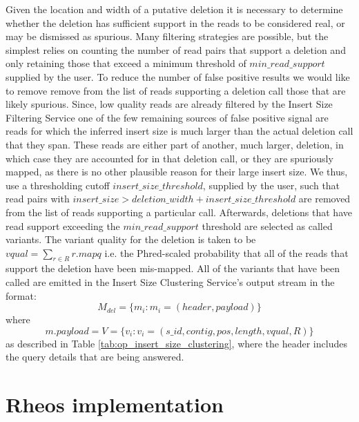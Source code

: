 Given the location and width of a putative deletion it is necessary to determine whether the deletion has sufficient support in the reads to be considered real, or may be dismissed as spurious. Many filtering strategies are possible, but the simplest relies on counting the number of read pairs that support a deletion and only retaining those that exceed a minimum threshold of $min\_read\_support$ supplied by the user. To reduce the number of false positive results we would like to remove remove from the list of reads supporting a deletion call those that are likely spurious. Since, low quality reads are already filtered by the Insert Size Filtering Service one of the few remaining sources of false positive signal are reads for which the inferred insert size is much larger than the actual deletion call that they span. These reads are either part of another, much larger, deletion, in which case they are accounted for in that deletion call, or they are spuriously mapped, as there is no other plausible reason for their large insert size. We thus, use a thresholding cutoff $insert\_size\_threshold$, supplied by the user, such that read pairs with $insert\_size > deletion\_width + insert\_size\_threshold$ are removed from the list of reads supporting a particular call. Afterwards, deletions that have read support exceeding the $min\_read\_support$ threshold are selected as called variants. 
\newpage
The variant quality for the deletion is taken to be $vqual = \sum_{r \in R}{r.mapq}$ i.e. the Phred-scaled probability that all of the reads that support the deletion have been mis-mapped. All of the variants that have been called are emitted in the Insert Size Clustering Service's output stream in the format: 
\begin{equation*}
    M_{del} = \{m_i: m_i = (header, payload)\}
\end{equation*} where 
\begin{equation*}
    m.payload = V = \{v_i: v_i = (s\_id, contig, pos, length, vqual, R)\}
\end{equation*}
as described in Table \ref{tab:op_insert_size_clustering}, where the header includes the query details that are being answered.


\section{Rheos implementation}\label{sec:rheos_implementation}

